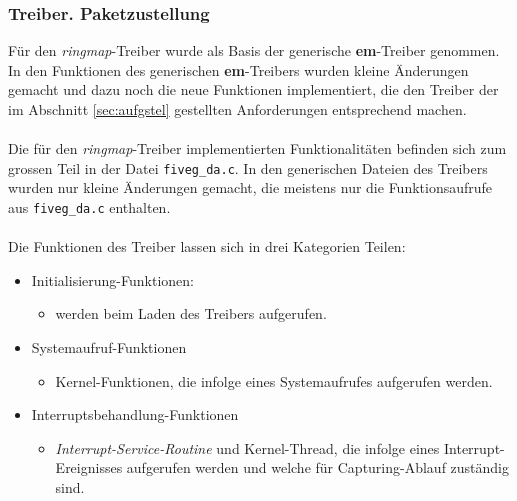 \subsubsection{Treiber. Paketzustellung}\label{sec:impl_treiber}
Für den \emph{ringmap}-Treiber wurde als Basis der generische \textbf{em}-Treiber
genommen.  In den Funktionen des generischen \textbf{em}-Treibers wurden kleine
Änderungen gemacht und dazu noch die neue Funktionen implementiert, die den
Treiber der im Abschnitt \ref{sec:aufgstel} gestellten Anforderungen
entsprechend machen.\\\\ 
%
Die für den \emph{ringmap}-Treiber implementierten Funktionalitäten befinden sich zum
grossen Teil in der Datei \verb+fiveg_da.c+. In den generischen Dateien des
Treibers wurden nur kleine Änderungen gemacht, die meistens nur die
Funktionsaufrufe aus \verb+fiveg_da.c+ enthalten. \\\\
%
Die Funktionen des Treiber lassen sich in drei Kategorien Teilen: 
\begin{itemize}
	\item Initialisierung-Funktionen:
		\begin{itemize}
			\item werden beim Laden des Treibers aufgerufen.
		\end{itemize}
	\item Systemaufruf-Funktionen
		\begin{itemize}
			\item Kernel-Funktionen, die infolge eines Systemaufrufes aufgerufen werden.
		\end{itemize}
	\item Interruptsbehandlung-Funktionen
		\begin{itemize}
			\item \emph{Interrupt-Service-Routine} und Kernel-Thread, die infolge eines 
				Interrupt-Ereignisses aufgerufen werden und welche für Capturing-Ablauf
				zuständig sind.
		\end{itemize}
\end{itemize}


